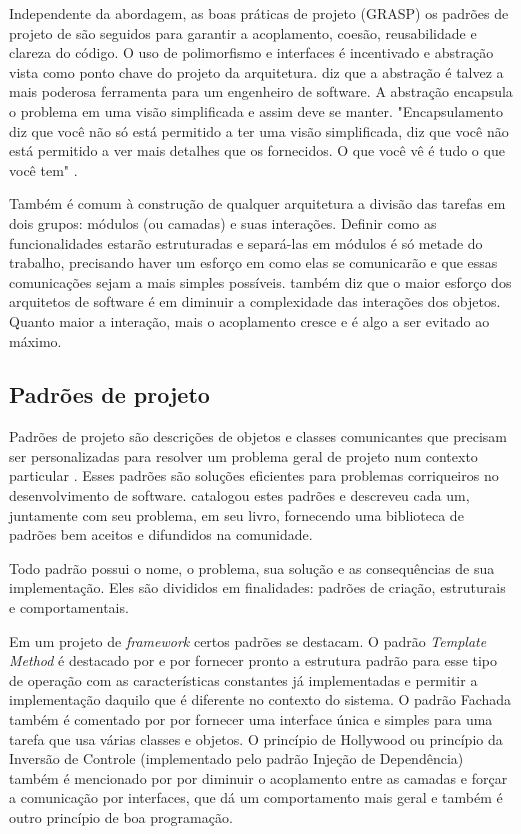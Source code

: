 Independente da abordagem, as boas práticas de projeto (GRASP) os padrões de projeto de \cite{Gamma1995} são seguidos para garantir a acoplamento, coesão, reusabilidade e clareza do código. O uso de polimorfismo e interfaces é incentivado e abstração vista como ponto chave do projeto da arquitetura. \cite{Szyperski2002} diz que a abstração é talvez a mais poderosa ferramenta para um engenheiro de software. A abstração encapsula o problema em uma visão simplificada e assim deve se manter. "Encapsulamento diz que você não só está permitido a ter uma visão simplificada, diz que você não está permitido a ver mais detalhes que os fornecidos. O que você vê é tudo o que você tem" \cite{McConnel2004}.

Também é comum à construção de qualquer arquitetura a divisão das tarefas em dois grupos: módulos (ou camadas) e suas interações. Definir como as funcionalidades estarão estruturadas e separá-las em módulos é só metade do trabalho, precisando haver um esforço em como elas se comunicarão e que essas comunicações sejam a mais simples possíveis. \cite{Szyperski2002} também diz que o maior esforço dos arquitetos de software é em diminuir a complexidade das interações dos objetos. Quanto maior a interação, mais o acoplamento cresce e é algo a ser evitado ao máximo.

\subsection{Padrões de projeto}

Padrões de projeto são descrições de objetos e classes comunicantes que precisam ser personalizadas para resolver um problema geral de projeto num contexto particular \cite{Gamma1995}. Esses padrões são soluções eficientes para problemas corriqueiros no desenvolvimento de software. \cite{Gamma1995} catalogou estes padrões e descreveu cada um, juntamente com seu problema, em seu livro, fornecendo uma biblioteca de padrões bem aceitos e difundidos na comunidade.

Todo padrão possui o nome, o problema, sua solução e as consequências de sua implementação. Eles são divididos em finalidades: padrões de criação, estruturais e comportamentais.

Em um projeto de \textit{framework} certos padrões se destacam. O padrão \textit{Template Method} é destacado por \cite{Larman2005} e \cite{Fayad1999} por fornecer pronto a estrutura padrão para esse tipo de operação com as características constantes já implementadas e permitir a implementação daquilo que é diferente no contexto do sistema. O padrão Fachada também é comentado por \cite{Larman2005} por fornecer uma interface única e simples para uma tarefa que usa várias classes e objetos. O princípio de Hollywood ou princípio da Inversão de Controle (implementado pelo padrão Injeção de Dependência) também é mencionado por \cite{Larman2005} por diminuir o acoplamento entre as camadas e forçar a comunicação por interfaces, que dá um comportamento mais geral e também é outro princípio de boa programação.


